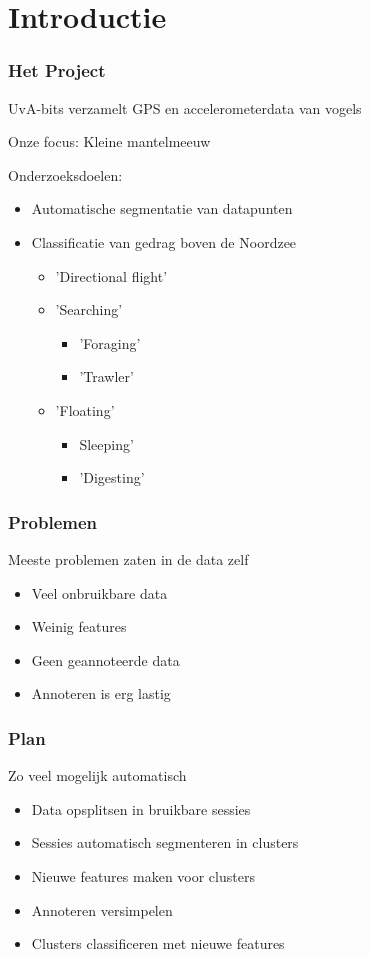 \documentclass{beamer}
\title{\projectName}
\subtitle{\projectAbbreviation}
\author{Jesse Eisses, Sosha Happel, Maarten Inja and Maarten de Waard}
\institute{UvA}
\newcommand{\slide}[2]
{
\begin{frame}
\frametitle{#1} 

#2

\end{frame}
}
\begin{document}
\begin{frame}
\titlepage
\end{frame}



\section{Introductie}
\slide{Het Project}
{
UvA-bits verzamelt GPS en accelerometerdata van vogels

Onze focus: Kleine mantelmeeuw
\vspace{0.5cm}

Onderzoeksdoelen:
\begin{itemize}
	\item Automatische segmentatie van datapunten
	\item Classificatie van gedrag boven de Noordzee
	\begin{itemize}
		\item 'Directional flight'
		\item 'Searching'
		\begin{itemize}
			\item 'Foraging'
			\item 'Trawler'
		\end{itemize}
		\item 'Floating'
		\begin{itemize}
			\item Sleeping'
			\item 'Digesting'
		\end{itemize}

	\end{itemize}
\end{itemize} 
}

\slide{Problemen}
{
Meeste problemen zaten in de data zelf
\begin{itemize}
	\item Veel onbruikbare data
	\item Weinig features
	\item Geen geannoteerde data
	\item Annoteren is erg lastig
\end{itemize} 
}

\slide{Plan}
{
Zo veel mogelijk automatisch
\begin{itemize}
	\item Data opsplitsen in bruikbare sessies
	\item Sessies automatisch segmenteren in clusters
	\item Nieuwe features maken voor clusters
	\item Annoteren versimpelen
	\item Clusters classificeren met nieuwe features
\end{itemize} 
}
\end{document}
